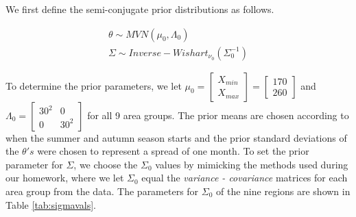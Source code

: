 \documentclass{article}
\begin{document}
We first define the semi-conjugate prior distributions as follows. 

\begin{align*}
\theta \sim MVN(\mu_0, \Lambda_0) \\
\Sigma \sim Inverse-Wishart_{\nu_0}(\Sigma_0^{-1})
\end{align*}

To determine the prior parameters, we let $\mu_0 = \begin{bmatrix} X_{min} \\ X_{max} \end{bmatrix} = \begin{bmatrix} 170 \\ 260 \end{bmatrix}$ and $\Lambda_0 = \begin{bmatrix} 30^2 & 0 \\ 0 & 30^2 \end{bmatrix}$ for all 9 area groups. The prior means are chosen according to when the summer and autumn season starts and the prior standard deviations of the $\theta 's$ were chosen to represent a spread of one month. To set the prior parameter for $\Sigma$, we choose the $\Sigma_0$ values by mimicking the methods used during our homework, where we let $\Sigma_0$ equal the \textit{variance - covariance} matrices for each area group from the data. The parameters for $\Sigma_0$ of the nine regions are shown in Table \ref{tab:sigmavals}.
\end{document}

